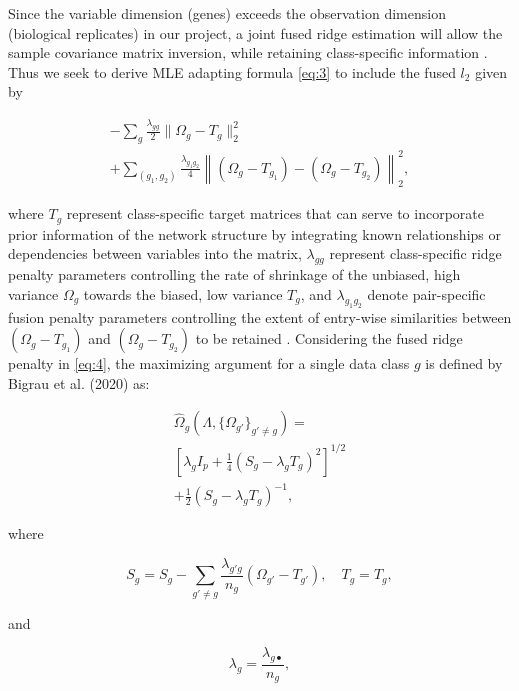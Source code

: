 \documentclass[
	a4paper, %
	10pt, %
	unnumberedsections, %
	twoside, %
]{LTJournalArticle}
\begin{document}
\noindent Since the variable dimension (genes) exceeds the observation 
dimension (biological replicates) in our project, a joint fused ridge estimation will allow the sample 
covariance matrix inversion,
while retaining class-specific information \autocite{peeters2022a}. 
Thus we seek to derive MLE adapting 
formula \ref{eq:3} to include the fused $l_2$ given by

\begin{multline} \label{eq:4}
	- \sum_g \frac{\lambda_{gg}}{2} \|\Omega_g - T_g\|_2^2 \\
	+ \sum_{(g_1, g_2)} \frac{\lambda_{g_1 g_2}}{4} \left\|(\Omega_g - T_{g_1}) - (\Omega_g - T_{g_2})\right\|_2^2,
\end{multline}

\noindent where $T_g$ represent class-specific target matrices that can serve 
to incorporate prior information of the network structure by integrating known 
relationships or dependencies between 
variables into the matrix, $\lambda_{gg}$ represent class-specific ridge penalty 
parameters controlling the rate of shrinkage of the unbiased, high 
variance $\Omega_g$ towards the biased, 
low variance $T_g$, and $\lambda_{g_1 g_2}$ denote pair-specific 
fusion penalty parameters controlling the extent of entry-wise 
similarities between $(\Omega_g - T_{g_1})$ and $(\Omega_g - T_{g_2})$ 
to be retained \autocite{bilgrau2020a, peeters2022a}.
Considering the fused ridge penalty in \ref{eq:4}, the maximizing argument 
for a single data class $g$ is defined by Bigrau et al. (2020) \autocite{bilgrau2020a} as:

\begin{multline} \label{eq:5}
	\hat{\Omega}_g(\Lambda, \{\Omega_{g'}\}_{g' \neq g}) = \\
	\left[\lambda_{g} I_p + \frac{1}{4} (S_{g} - \lambda_{g} T_{g})^2 \right]^{1/2} \\
	+ \frac{1}{2} (S_{g} - \lambda_{g} T_{g})^{-1},
\end{multline}

where

\begin{equation} \label{eq:6}
	S_{g} = S_g - \sum_{g' \neq g} \frac{\lambda_{g' g}}{n_g} (\Omega_{g'} - T_{g'}),
	\quad
	T_{g} = T_g,
\end{equation}

and
	
\begin{equation} \label{eq:7}
	\lambda_{g} = \frac{\lambda_{g \bullet}}{n_g},
\end{equation}
\end{document}
